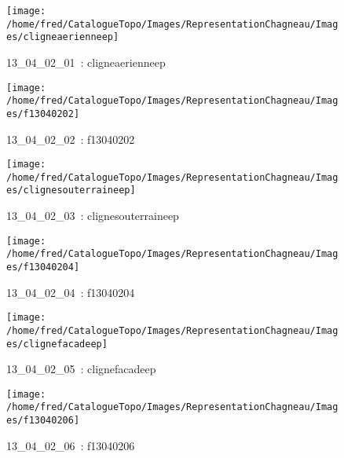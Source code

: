 \documentclass[12pt,titlepage]{book}
\begin{document}
\begin{figure}[h!]
  \hfill         %
  \begin{minipage}[t]{3cm}
    \begin{center}
      \texttt{[image: /home/fred/CatalogueTopo/Images/RepresentationChagneau/Images/cligneaerienneep]}
      \caption[~13\_04\_02\_01]{\small{13\_04\_02\_01~:} \tiny{cligneaerienneep}}\label{cligneaerienneep}
    \end{center}
  \end{minipage}
  \begin{minipage}[t]{3cm}
    \begin{center}
      \texttt{[image: /home/fred/CatalogueTopo/Images/RepresentationChagneau/Images/f13040202]}
      \caption[~13\_04\_02\_02]{\small{13\_04\_02\_02~:} \tiny{f13040202}}\label{f13040202}
    \end{center}
  \end{minipage}
  \begin{minipage}[t]{3cm}
    \begin{center}
      \texttt{[image: /home/fred/CatalogueTopo/Images/RepresentationChagneau/Images/clignesouterraineep]}
      \caption[~13\_04\_02\_03]{\small{13\_04\_02\_03~:} \tiny{clignesouterraineep}}\label{clignesouterraineep}
    \end{center}
  \end{minipage}
  \begin{minipage}[t]{3cm}
    \begin{center}
      \texttt{[image: /home/fred/CatalogueTopo/Images/RepresentationChagneau/Images/f13040204]}
      \caption[~13\_04\_02\_04]{\small{13\_04\_02\_04~:} \tiny{f13040204}}\label{f13040204}
    \end{center}
  \end{minipage}
  \begin{minipage}[t]{3cm}
    \begin{center}
      \texttt{[image: /home/fred/CatalogueTopo/Images/RepresentationChagneau/Images/clignefacadeep]}
      \caption[~13\_04\_02\_05]{\small{13\_04\_02\_05~:} \tiny{clignefacadeep}}\label{clignefacadeep}
    \end{center}
  \end{minipage}
  \begin{minipage}[t]{3cm}
    \begin{center}
      \texttt{[image: /home/fred/CatalogueTopo/Images/RepresentationChagneau/Images/f13040206]}
      \caption[~13\_04\_02\_06]{\small{13\_04\_02\_06~:} \tiny{f13040206}}\label{f13040206}
    \end{center}
  \end{minipage}
\end{figure}
\end{document}

